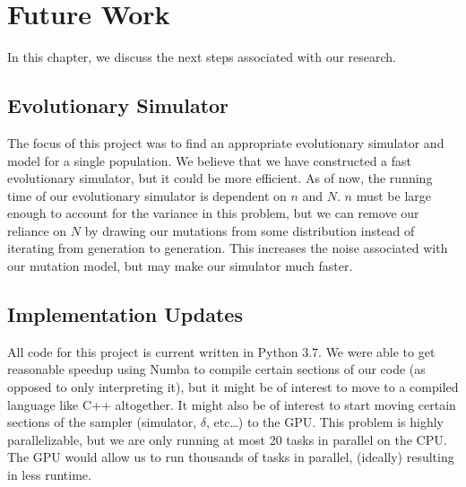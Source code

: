 \chapter{Future Work}\label{ch:futureWork}
In this chapter, we discuss the next steps associated with our research.

\section{Evolutionary Simulator}\label{sec:evolutionarySimulator}
The focus of this project was to find an appropriate evolutionary simulator and model for a single population.
We believe that we have constructed a fast evolutionary simulator, but it could be more efficient.
As of now, the running time of our evolutionary simulator is dependent on $n$ and $N$.
$n$ must be large enough to account for the variance in this problem, but we can remove our reliance on $N$ by
drawing our mutations from some distribution instead of iterating from generation to generation.
This increases the noise associated with our mutation model, but may make our simulator much faster.

\section{Implementation Updates}\label{sec:implementationUpdates}
All code for this project is current written in Python 3.7.
We were able to get reasonable speedup using Numba to compile certain sections of our code (as opposed to only
interpreting it), but it might be of interest to move to a compiled language like C++ altogether.
It might also be of interest to start moving certain sections of the sampler (simulator, $\delta$, etc\ldots) to the
GPU.
This problem is highly parallelizable, but we are only running at most 20 tasks in parallel on the CPU.
The GPU would allow us to run thousands of tasks in parallel, (ideally) resulting in less runtime.

